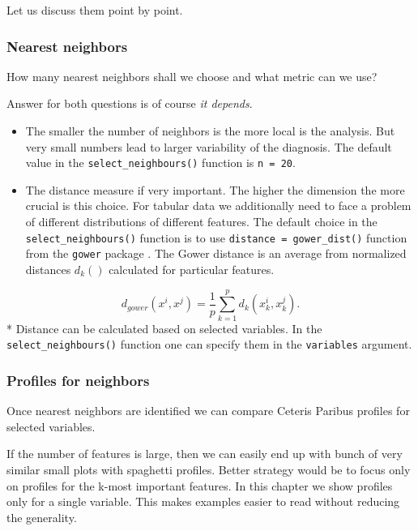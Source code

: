 \documentclass[12pt,]{krantz}
\providecommand{\tightlist}{%
  \setlength{\itemsep}{0pt}\setlength{\parskip}{0pt}}
\theoremstyle{definition}
\theoremstyle{definition}
\theoremstyle{definition}
\theoremstyle{remark}
\begin{document}
Let us discuss them point by point.

\hypertarget{nearest-neighbors}{%
\subsubsection{Nearest neighbors}\label{nearest-neighbors}}

How many nearest neighbors shall we choose and what metric can we use?

Answer for both questions is of course \emph{it depends}.

\begin{itemize}
\tightlist
\item
  The smaller the number of neighbors is the more local is the analysis.
  But very small numbers lead to larger variability of the diagnosis.
  The default value in the \texttt{select\_neighbours()} function is
  \texttt{n\ =\ 20}.
\item
  The distance measure if very important. The higher the dimension the
  more crucial is this choice. For tabular data we additionally need to
  face a problem of different distributions of different features. The
  default choice in the \texttt{select\_neighbours()} function is to use
  \texttt{distance\ =\ gower\_dist()} function from the \texttt{gower}
  package \citep{gowerRPackage}. The Gower distance is an average from
  normalized distances \(d_k()\) calculated for particular features.
\end{itemize}

\[
d_{gower}(x^i, x^j) = \frac 1p \sum_{k=1}^p d_k(x_k^i, x_k^j).
\] * Distance can be calculated based on selected variables. In the
\texttt{select\_neighbours()} function one can specify them in the
\texttt{variables} argument.

\hypertarget{profiles-for-neighbors}{%
\subsubsection{Profiles for neighbors}\label{profiles-for-neighbors}}

Once nearest neighbors are identified we can compare Ceteris Paribus
profiles for selected variables.

If the number of features is large, then we can easily end up with bunch
of very similar small plots with spaghetti profiles. Better strategy
would be to focus only on profiles for the k-most important features. In
this chapter we show profiles only for a single variable. This makes
examples easier to read without reducing the generality.
\end{document}
